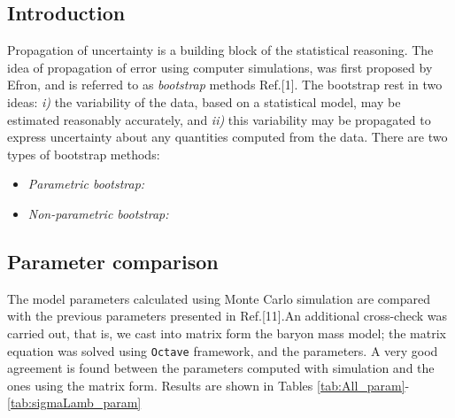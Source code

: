 \documentclass{article}
\begin{document}
\subsection*{Introduction}

Propagation of uncertainty is a building block of the statistical reasoning. The idea of propagation of error using computer simulations, was first proposed by Efron, and is referred to as \textit{bootstrap} methods Ref.[1].  The bootstrap rest in two ideas: \textit{i)} the variability of the data, based on a statistical model, may be estimated reasonably accurately,  and \textit{ii)} this variability may be propagated to express uncertainty about any quantities computed from the data. There are two types of bootstrap methods:

\begin{itemize}
\item\textit{Parametric bootstrap:}
\item\textit{Non-parametric bootstrap:}
\end{itemize}

\subsection{Parameter comparison}
The model parameters calculated using Monte Carlo simulation are compared with the previous parameters presented in Ref.[11].An additional cross-check was carried out, that is, we cast into matrix form the baryon mass model; the matrix equation was solved using \texttt{Octave} framework, and the parameters.  A very good agreement is found between the parameters computed with simulation and the ones using the matrix form. Results are shown in Tables \ref{tab:All_param}-\ref{tab:sigmaLamb_param}



\begin{table}[h!]

\end{table}

\begin{table}[h!]

\end{table}

\begin{table}[h!]

\end{table}

\begin{table}[h!]

\end{table}
\end{document}
